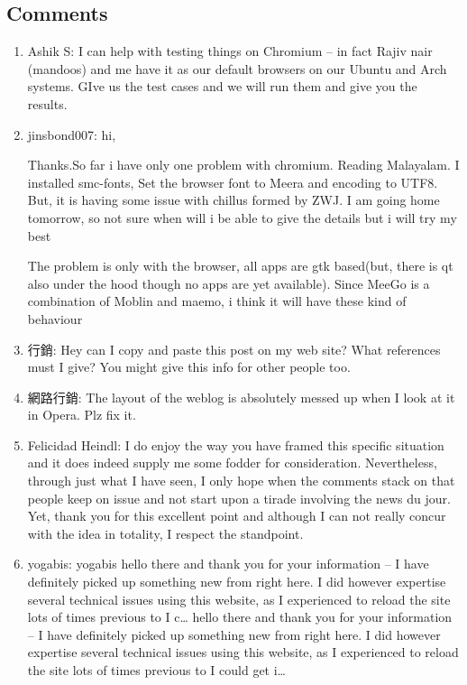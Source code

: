 \subsection{Comments}
\begin{enumerate}
 \item Ashik S: 
I can help with testing things on Chromium – in fact Rajiv nair (mandoos) and me have it as our default browsers on our Ubuntu and Arch systems. GIve us the test cases and we will run them and give you the results.

 \item jinsbond007:
hi,

Thanks.So far i have only one problem with chromium. Reading Malayalam.
I installed smc-fonts, Set the browser font to Meera and encoding to UTF8. But, it is having some issue with chillus formed by ZWJ.
I am going home tomorrow, so not sure when will i be able to give the details but i will try my best 

The problem is only with the browser, all apps are gtk based(but, there is qt also under the hood though no apps are yet available). Since MeeGo is a combination of Moblin and maemo, i think it will have these kind of behaviour 

 \item 行銷: 
Hey can I copy and paste this post on my web site? What references must I give? You might give this info for other people too.

 \item 網路行銷: 
The layout of the weblog is absolutely messed up when I look at it in Opera. Plz fix it.

 \item Felicidad Heindl:
I do enjoy the way you have framed this specific situation and it does indeed supply me some fodder for consideration. Nevertheless, through just what I have seen, I only hope when the comments stack on that people keep on issue and not start upon a tirade involving the news du jour. Yet, thank you for this excellent point and although I can not really concur with the idea in totality, I respect the standpoint.

 \item yogabis:
yogabis hello there and thank you for your information – I have definitely picked up something new from right here. I did however expertise several technical issues using this website, as I experienced to reload the site lots of times previous to I c…
hello there and thank you for your information – I have definitely picked up something new from right here. I did however expertise several technical issues using this website, as I experienced to reload the site lots of times previous to I could get i…

\end{enumerate}

\newpage 